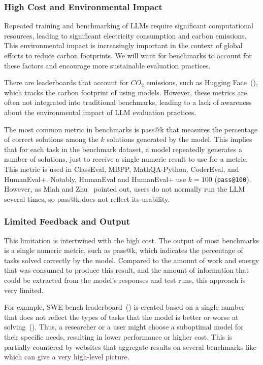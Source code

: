 \subsubsection{High Cost and Environmental Impact}

Repeated training and benchmarking of LLMs require significant computational resources, leading to significant electricity consumption and carbon emissions. This environmental impact is increasingly important in the context of global efforts to reduce carbon footprints.
We will want for benchmarks to account for these factors and encourage more sustainable evaluation practices.

There are leaderboards that account for $CO_2$ emissions, such as Hugging Face~(\cite{huggingfaceCalculation}), which tracks the carbon footprint of using models. However, these metrics are often not integrated into traditional benchmarks, leading to a lack of awareness about the environmental impact of LLM evaluation practices.

The most common metric in benchmarks is pass@k that measures the percentage of correct solutions among the $k$ solutions generated by the model.
This implies that for each task in the benchmark dataset, a model repeatedly generates a number of solutions, just to receive a single numeric result to use for a metric.
This metric is used in ClassEval, MBPP, MathQA-Python, CoderEval, and HumanEval+.
Notably, HumanEval and HumanEval+ use $k=100$ (\texttt{pass@100}).
However, as Miah and Zhu~\cite{miah2024usercentricevaluationcode} pointed out, users do not normally run the LLM several times, so pass@k does not reflect its usability.

\subsubsection{Limited Feedback and Output}

This limitation is intertwined with the high cost.
The output of most benchmarks is a single numeric metric, such as pass@k, which indicates the percentage of tasks solved correctly by the model.
Compared to the amount of work and energy that was consumed to produce this result, and the amount of information that could be extracted from the model's responses and test runs, this approach is very limited.

For example, SWE-bench leaderboard~(\cite{swebenchSWEbenchLeaderboards}) is created based on a single number that does not reflect the types of tasks that the model is better or worse at solving~(\cite{miah2024usercentricevaluationcode}).
Thus, a researcher or a user might choose a suboptimal model for their specific needs, resulting in lower performance or higher cost.
This is partially countered by websites that aggregate results on several benchmarks like~\cite{vellumLeaderboard2025} which can give a very high-level picture.

